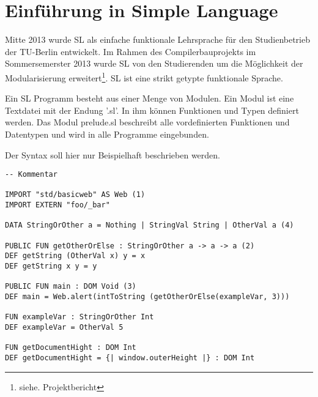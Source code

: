\documentclass[12pt]{scrreprt}
\begin{document}
\chapter{ Einführung in Simple Language}

Mitte 2013 wurde \ac{SL} als einfache funktionale Lehrsprache für den Studienbetrieb der TU-Berlin entwickelt. Im Rahmen des Compilerbauprojekts im Sommersemerster 2013 wurde \ac{SL} von den Studierenden um die Möglichkeit der Modularisierung erweitert\footnote{siehe. Projektbericht}. \ac{SL} ist eine strikt getypte funktionale Sprache.

Ein \ac{SL} Programm besteht aus einer Menge von Modulen. Ein Modul ist eine Textdatei mit der Endung '.sl'. In ihm können Funktionen und Typen definiert werden. Das Modul prelude.sl beschreibt alle vordefinierten Funktionen und Datentypen und wird in alle Programme eingebunden.

Der Syntax soll hier nur Beispielhaft beschrieben werden. 

\begin{lstlisting}[caption=Beispielmodul, label=lst:bsp1]
-- Kommentar

IMPORT "std/basicweb" AS Web (1)
IMPORT EXTERN "foo/_bar"

DATA StringOrOther a = Nothing | StringVal String | OtherVal a (4)

PUBLIC FUN getOtherOrElse : StringOrOther a -> a -> a (2)
DEF getString (OtherVal x) y = x
DEF getString x y = y

PUBLIC FUN main : DOM Void (3)
DEF main = Web.alert(intToString (getOtherOrElse(exampleVar, 3)))

FUN exampleVar : StringOrOther Int
DEF exampleVar = OtherVal 5

FUN getDocumentHight : DOM Int
DEF getDocumentHight = {| window.outerHeight |} : DOM Int

\end{lstlisting}
\end{document}

